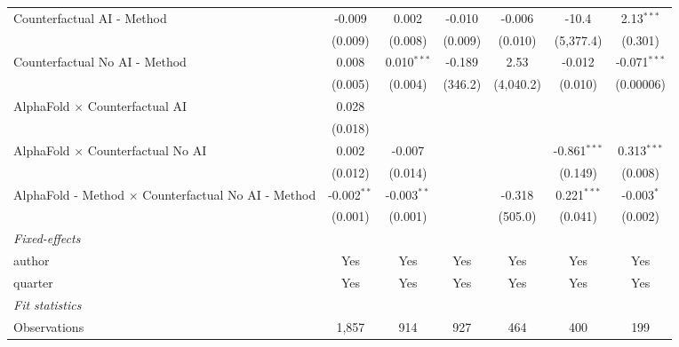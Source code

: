 \begin{tabular}{lcccccc}
   Counterfactual AI - Method                                 & -0.009        & 0.002         & -0.010  & -0.006    & -10.4          & 2.13$^{***}$\\   
                                                              & (0.009)       & (0.008)       & (0.009) & (0.010)   & (5,377.4)      & (0.301)\\   
   Counterfactual No AI - Method                              & 0.008         & 0.010$^{***}$ & -0.189  & 2.53      & -0.012         & -0.071$^{***}$\\   
                                                              & (0.005)       & (0.004)       & (346.2) & (4,040.2) & (0.010)        & (0.00006)\\   
   AlphaFold $\times$ Counterfactual AI                       & 0.028         &               &         &           &                &   \\   
                                                              & (0.018)       &               &         &           &                &   \\   
   AlphaFold $\times$ Counterfactual No AI                    & 0.002         & -0.007        &         &           & -0.861$^{***}$ & 0.313$^{***}$\\   
                                                              & (0.012)       & (0.014)       &         &           & (0.149)        & (0.008)\\   
   AlphaFold - Method $\times$ Counterfactual No AI - Method  & -0.002$^{**}$ & -0.003$^{**}$ &         & -0.318    & 0.221$^{***}$  & -0.003$^{*}$\\   
                                                              & (0.001)       & (0.001)       &         & (505.0)   & (0.041)        & (0.002)\\   
   \midrule
   \emph{Fixed-effects}\\
   author                                                     & Yes           & Yes           & Yes     & Yes       & Yes            & Yes\\  
   quarter                                                    & Yes           & Yes           & Yes     & Yes       & Yes            & Yes\\  
   \midrule
   \emph{Fit statistics}\\
   Observations                                               & 1,857         & 914           & 927     & 464       & 400            & 199\\  

\end{tabular}
